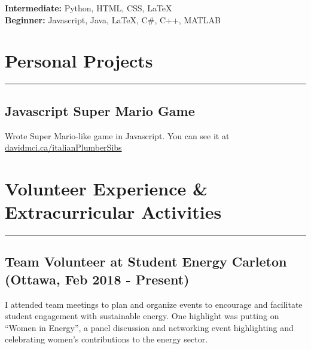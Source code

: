 \documentclass[11pt]{article}
\begin{document}
	\noindent \textbf{Intermediate: } Python, HTML, CSS, \LaTeX
	\\
	\noindent \textbf{Beginner: } Javascript, Java, \LaTeX , C\#, C++, MATLAB
		
	
	\section{Personal Projects}
	\hrule \hfill %
	\subsection{Javascript Super Mario Game}	
	\noindent Wrote Super Mario-like game in Javascript. You can see it at \href{http://davidmci.ca/italianPlumberSibs}{davidmci.ca/italianPlumberSibs}

	
	\section{Volunteer Experience \& Extracurricular Activities}
	\hrule \hfill
	
	\subsection{Team Volunteer at Student Energy Carleton (Ottawa, Feb 2018 - Present)}
\noindent I attended team meetings to plan and organize events to encourage and facilitate student engagement with sustainable energy. One highlight was putting on “Women in Energy”, a panel discussion and networking event highlighting and celebrating women’s contributions to the energy sector.
	
\end{document}

